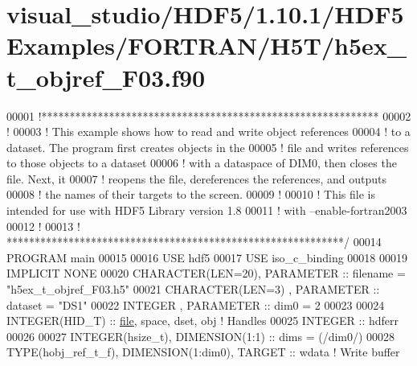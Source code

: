 \hypertarget{visual__studio_2_h_d_f5_21_810_81_2_h_d_f5_examples_2_f_o_r_t_r_a_n_2_h5_t_2h5ex__t__objref___f03_8f90_source}{}\section{visual\+\_\+studio/\+H\+D\+F5/1.10.1/\+H\+D\+F5\+Examples/\+F\+O\+R\+T\+R\+A\+N/\+H5\+T/h5ex\+\_\+t\+\_\+objref\+\_\+\+F03.f90}
\label{visual__studio_2_h_d_f5_21_810_81_2_h_d_f5_examples_2_f_o_r_t_r_a_n_2_h5_t_2h5ex__t__objref___f03_8f90_source}

\begin{DoxyCode}
00001 \textcolor{comment}{!************************************************************}
00002 \textcolor{comment}{!}
00003 \textcolor{comment}{!  This example shows how to read and write object references}
00004 \textcolor{comment}{!  to a dataset.  The program first creates objects in the}
00005 \textcolor{comment}{!  file and writes references to those objects to a dataset}
00006 \textcolor{comment}{!  with a dataspace of DIM0, then closes the file.  Next, it}
00007 \textcolor{comment}{!  reopens the file, dereferences the references, and outputs}
00008 \textcolor{comment}{!  the names of their targets to the screen.}
00009 \textcolor{comment}{!}
00010 \textcolor{comment}{!  This file is intended for use with HDF5 Library version 1.8}
00011 \textcolor{comment}{!  with --enable-fortran2003}
00012 \textcolor{comment}{!}
00013 \textcolor{comment}{! ************************************************************/}
00014 \textcolor{keyword}{PROGRAM} main
00015 
00016   \textcolor{keywordtype}{USE }hdf5
00017   \textcolor{keywordtype}{USE }iso\_c\_binding
00018 
00019   \textcolor{keywordtype}{IMPLICIT NONE}
00020   \textcolor{keywordtype}{CHARACTER(LEN=20)}, \textcolor{keywordtype}{PARAMETER} :: filename  = \textcolor{stringliteral}{"h5ex\_t\_objref\_F03.h5"}
00021   \textcolor{keywordtype}{CHARACTER(LEN=3)} , \textcolor{keywordtype}{PARAMETER} :: dataset   = \textcolor{stringliteral}{"DS1"}
00022   \textcolor{keywordtype}{INTEGER}          , \textcolor{keywordtype}{PARAMETER} :: dim0      = 2
00023 
00024   \textcolor{keywordtype}{INTEGER(HID\_T)}  :: \hyperlink{structfile}{file}, space, dset, obj \textcolor{comment}{! Handles}
00025   \textcolor{keywordtype}{INTEGER} :: hdferr
00026 
00027   \textcolor{keywordtype}{INTEGER(hsize\_t)},   \textcolor{keywordtype}{DIMENSION(1:1)} :: dims = (/dim0/)
00028   \textcolor{keywordtype}{TYPE}(hobj\_ref\_t\_f), \textcolor{keywordtype}{DIMENSION(1:dim0)}, \textcolor{keywordtype}{TARGET} :: wdata \textcolor{comment}{! Write buffer}

\end{DoxyCode}
